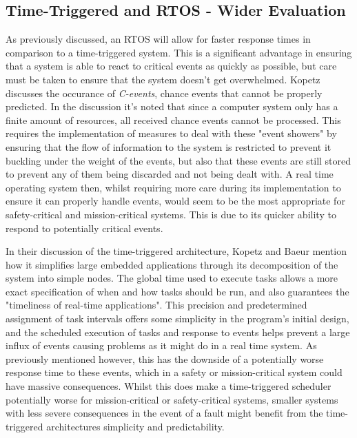 \documentclass[]{report}
\begin{document}
			\subsection{Time-Triggered and RTOS - Wider Evaluation}
			As previously discussed, an RTOS will allow for faster response times in comparison to a time-triggered system. This is a significant advantage in ensuring that a system is able to react to critical events as quickly as possible, but care must be taken to ensure that the system doesn't get overwhelmed. Kopetz\cite{kopetz1991event} discusses the occurance of \textit{C-events}, chance events that cannot be properly predicted. In the discussion it's noted that since a computer system only has a finite amount of resources, all received chance events cannot be processed. This requires the implementation of measures to deal with these "event showers" by ensuring that the flow of information to the system is restricted to prevent it buckling under the weight of the events, but also that these events are still stored to prevent any of them being discarded and not being dealt with. A real time operating system then, whilst requiring more care during its implementation to ensure it can properly handle events, would seem to be the most appropriate for safety-critical and mission-critical systems. This is due to its quicker ability to respond to potentially critical events.
			\medskip
			
			In their discussion of the time-triggered architecture, Kopetz and Baeur\cite{kopetz2003time} mention how it simplifies large embedded applications through its decomposition of the system into simple nodes. The global time used to execute tasks allows a more exact specification of when and how tasks should be run, and also guarantees the "timeliness of real-time applications". This precision and predetermined assignment of task intervals offers some simplicity in the program's initial design, and the scheduled execution of tasks and response to events helps prevent a large influx of events causing problems as it might do in a real time system. As previously mentioned however, this has the downside of a potentially worse response time to these events, which in a safety or mission-critical system could have massive consequences. Whilst this does make a time-triggered scheduler potentially worse for mission-critical or safety-critical systems, smaller systems with less severe consequences in the event of a fault might benefit from the time-triggered architectures simplicity and predictability. 
		
\end{document}
